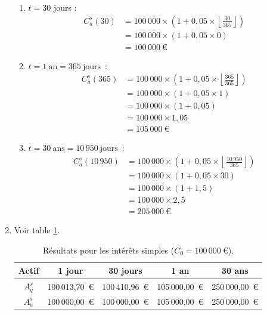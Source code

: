 \documentclass{article}
\begin{document}
\begin{enumerate}[label=\textbf{Q\arabic*.}]
\begin{enumerate}[label=(\alph*)]
        \item \( t = 30 \) jours : 
        \begin{align*}
        C_a^s(30) &= 100\,000 \times \left(1 + 0,05 \times \left\lfloor \frac{30}{365} \right\rfloor \right) \\
                 &= 100\,000 \times \left(1 + 0,05 \times 0 \right) \\
                 &= \boxed{100\,000\ \text{€}}
        \end{align*}
        
        \item $t = 1\ \text{an} = 365\ \text{jours}$~: 
        \begin{align*}
        C_a^s(365) &= 100\,000 \times \left(1 + 0,05 \times \left\lfloor \frac{365}{365} \right\rfloor \right) \\
                 &= 100\,000 \times \left(1 + 0,05 \times 1 \right) \\
                 &= 100\,000 \times \left(1 + 0,05 \right) \\
                 &= 100\,000 \times 1,05 \\
                 &= \boxed{105\,000\ \text{€}}
        \end{align*}
        
        \item $t = 30\ \text{ans} = 10\,950\ \text{jours}$~: 
        \begin{align*}
        C_a^s(10\,950) &= 100\,000 \times \left(1 + 0,05 \times \left\lfloor \frac{10\,950}{365} \right\rfloor \right) \\
                 &= 100\,000 \times \left(1 + 0,05 \times 30 \right) \\
                 &= 100\,000 \times \left(1 + 1,5 \right) \\
                 &= 100\,000 \times 2,5 \\
                 &= \boxed{205\,000\ \text{€}}
        \end{align*}
    \end{enumerate}

    \item Voir table \ref{tab:simple_interest_results}.
    \begin{table}[h!]
        \centering
        \begin{tabular}{|c|c|c|c|c|}
        \hline
        \textbf{Actif} & \textbf{1 jour} & \textbf{30 jours} & \textbf{1 an} & \textbf{30 ans} \\
        \hline
        \( A_q^s \) & 100\,013,70\ € & 100\,410,96\ € & 105\,000,00\ € & 250\,000,00\ € \\
        \hline
        \( A_a^s \) & 100\,000,00\ € & 100\,000,00\ € & 105\,000,00\ € & 250\,000,00\ € \\
        \hline
        \end{tabular}
        \caption{Résultats pour les intérêts simples (\( C_0 = 100\,000\ \text{€} \)).}
        \label{tab:simple_interest_results}
    \end{table}


\end{enumerate}
\end{document}
